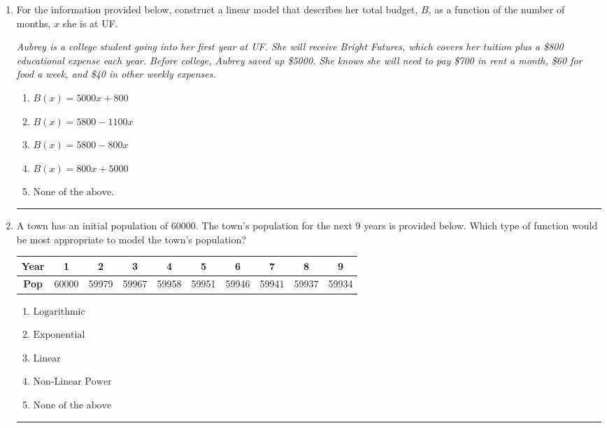 \documentclass[14pt]{extbook}
\newcommand{\litem}[1]{\item#1\hspace*{-1cm}\rule{\textwidth}{0.4pt}}
\begin{document}
\begin{enumerate}
{\begin{enumerate}[label=\Alph*.]
\end{enumerate} }
\litem{
For the information provided below, construct a linear model that describes her total budget, $B$, as a function of the number of months, $x$ she is at UF.
\begin{center}
    \textit{ Aubrey is a college student going into her first year at UF. She will receive Bright Futures, which covers her tuition plus a \$800 educational expense each year. Before college, Aubrey saved up \$5000. She knows she will need to pay \$700 in rent a month, \$60 for food a week, and \$40 in other weekly expenses. }
\end{center}
\begin{enumerate}[label=\Alph*.]
\item \( B(x) = 5000 x + 800 \)
\item \( B(x) = 5800 - 1100 x \)
\item \( B(x) = 5800 - 800 x \)
\item \( B(x) = 800 x + 5000 \)
\item \( \text{None of the above.} \)

\end{enumerate} }
\litem{
A town has an initial population of 60000. The town's population for the next 9 years is provided below. Which type of function would be most appropriate to model the town's population?

\begin{tabular}{c|c|c|c|c|c|c|c|c|c}
\textbf{Year} &1 &2 &3 &4 &5 &6 &7 &8 &9\tabularnewline \hline
\textbf{Pop} &60000 &59979 &59967 &59958 &59951 &59946 &59941 &59937 &59934\end{tabular}\begin{enumerate}[label=\Alph*.]
\item \( \text{Logarithmic} \)
\item \( \text{Exponential} \)
\item \( \text{Linear} \)
\item \( \text{Non-Linear Power} \)
\item \( \text{None of the above} \)


\end{enumerate}}
\end{enumerate}
\end{document}
